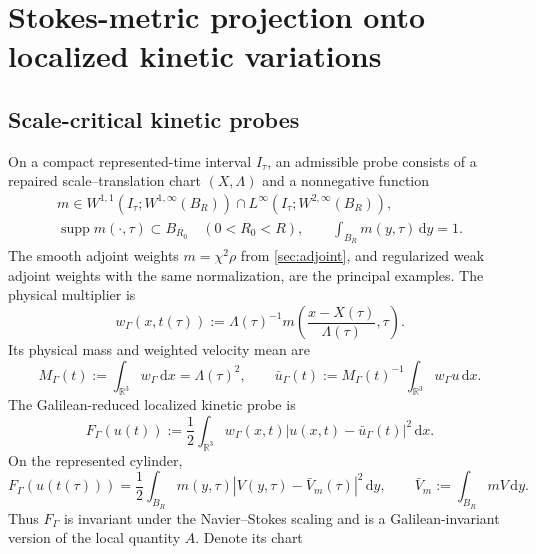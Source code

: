 \documentclass[11pt]{amsart}
\numberwithin{equation}{section}
\theoremstyle{plain}
\theoremstyle{definition}
\theoremstyle{remark}
\newcommand{\R}{\mathbb R}
\newcommand{\dd}{\,\mathrm d}
\newcommand{\supp}{\operatorname{supp}}
\begin{document}
\section{Stokes-metric projection onto localized kinetic variations}
\label{sec:alignment}

\subsection{Scale-critical kinetic probes}

On a compact represented-time interval \(I_\tau\), an admissible probe
consists of a repaired scale--translation chart \((X,\Lambda)\) and a
nonnegative function
\begin{equation}\label{eq:probe-m}
 \begin{gathered}
 m\in W^{1,1}(I_\tau;W^{1,\infty}(B_R))
     \cap L^\infty(I_\tau;W^{2,\infty}(B_R)),\\
 \supp m(\cdot,\tau)\subset B_{R_0}\quad(0<R_0<R),
 \qquad \int_{B_R}m(y,\tau)\dd y=1.
 \end{gathered}
\end{equation}
The smooth adjoint weights \(m=\chi^2\rho\) from \cref{sec:adjoint}, and
regularized weak adjoint weights with the same normalization, are the
principal examples.  The physical multiplier is
\begin{equation}\label{eq:physical-weight}
 w_\Gamma(x,t(\tau))
 :=\Lambda(\tau)^{-1}
 m\left(\frac{x-X(\tau)}{\Lambda(\tau)},\tau\right).
\end{equation}
Its physical mass and weighted velocity mean are
\begin{equation}\label{eq:physical-weighted-mean}
 M_\Gamma(t):=\int_{\R^3}w_\Gamma\dd x=\Lambda(\tau)^2,
 \qquad
 \bar u_\Gamma(t):=M_\Gamma(t)^{-1}
       \int_{\R^3}w_\Gamma u\dd x.
\end{equation}
The Galilean-reduced localized kinetic probe is
\begin{equation}\label{eq:kinetic-probe}
 F_\Gamma(u(t)):=\frac12\int_{\R^3}w_\Gamma(x,t)
       |u(x,t)-\bar u_\Gamma(t)|^2\dd x.
\end{equation}
On the represented cylinder,
\begin{equation}\label{eq:probe-chart-form}
 F_\Gamma(u(t(\tau)))
 =\frac12\int_{B_R}m(y,\tau)|V(y,\tau)-\bar V_m(\tau)|^2\dd y,
 \qquad
 \bar V_m:=\int_{B_R}mV\dd y.
\end{equation}
Thus \(F_\Gamma\) is invariant under the Navier--Stokes scaling and is a
Galilean-invariant version of the local quantity \(A\).  Denote its chart
\end{document}
